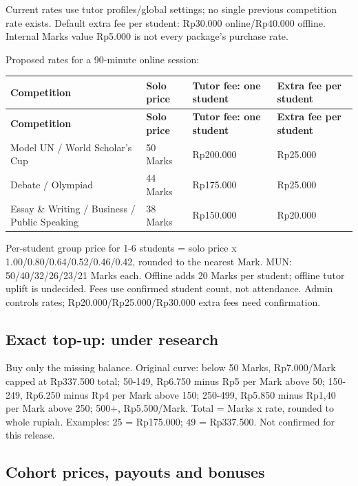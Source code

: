 \documentclass[11pt,a4paper]{article}
\begin{document}
Current rates use tutor profiles/\allowbreak{}global settings; no single previous competition rate exists. Default extra fee per student: Rp30.000 online/\allowbreak{}Rp40.000 offline. Internal Marks value Rp5.000 is not every package's purchase rate.

Proposed rates for a 90-minute online session:

{\small
\begin{longtable}{|L{23.56mm}|L{41.23mm}|L{41.23mm}|L{41.23mm}|}
\hline
\textbf{Competition} & \textbf{Solo price} & \textbf{Tutor fee: one student} & \textbf{Extra fee per student} \\ \hline
\endfirsthead
\hline
\textbf{Competition} & \textbf{Solo price} & \textbf{Tutor fee: one student} & \textbf{Extra fee per student} \\ \hline
\endhead
Model UN /\allowbreak{} World Scholar's Cup & 50 Marks & Rp200.000 & Rp25.000 \\ \hline
Debate /\allowbreak{} Olympiad & 44 Marks & Rp175.000 & Rp25.000 \\ \hline
Essay \& Writing /\allowbreak{} Business /\allowbreak{} Public Speaking & 38 Marks & Rp150.000 & Rp20.000 \\ \hline
\end{longtable}
}

Per-student group price for 1-6 students = solo price  x  1.00/\allowbreak{}0.80/\allowbreak{}0.64/\allowbreak{}0.52/\allowbreak{}0.46/\allowbreak{}0.42, rounded to the nearest Mark. MUN: 50/\allowbreak{}40/\allowbreak{}32/\allowbreak{}26/\allowbreak{}23/\allowbreak{}21 Marks each. Offline adds 20 Marks per student; offline tutor uplift is undecided. Fees use confirmed student count, not attendance. Admin controls rates; Rp20.000/\allowbreak{}Rp25.000/\allowbreak{}Rp30.000 extra fees need confirmation.

\subsection*{Exact top-up: under research}

Buy only the missing balance. Original curve: below 50 Marks, Rp7.000/\allowbreak{}Mark capped at Rp337.500 total; 50-149, Rp6.750 minus Rp5 per Mark above 50; 150-249, Rp6.250 minus Rp4 per Mark above 150; 250-499, Rp5.850 minus Rp1,40 per Mark above 250; 500+, Rp5.500/\allowbreak{}Mark. Total = Marks  x  rate, rounded to whole rupiah. Examples: 25 = Rp175.000; 49 = Rp337.500. Not confirmed for this release.

\subsection*{Cohort prices, payouts and bonuses}
\end{document}
